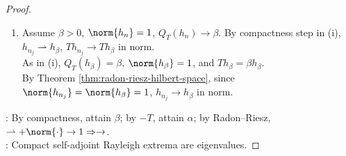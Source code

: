 \begin{corollary}
\begin{proof}
\begin{enumerate}[label=(\roman*)]
\item Assume $\beta>0$, $\norm{h_n}=1$, $Q_T(h_n)\to\beta$. By compactness step in (i), $h_{n_j}\rightharpoonup h_\beta$, $Th_{n_j}\to Th_\beta$ in norm.\\
As in (i), $Q_T(h_\beta)=\beta$, $\norm{h_\beta}=1$, and $Th_\beta=\beta h_\beta$.\\
By Theorem \ref{thm:radon-riesz-hilbert-space}, since $\norm{h_{n_j}}=\norm{h_\beta}=1$, $h_{n_j}\to h_\beta$ in norm.
\end{enumerate}
: By compactness, attain $\beta$; by $-T$, attain $\alpha$; by Radon--Riesz, $\rightharpoonup+\norm{\cdot}\to1\Rightarrow\to$.\\
: Compact self-adjoint Rayleigh extrema are eigenvalues.
\end{proof}
\end{corollary}

